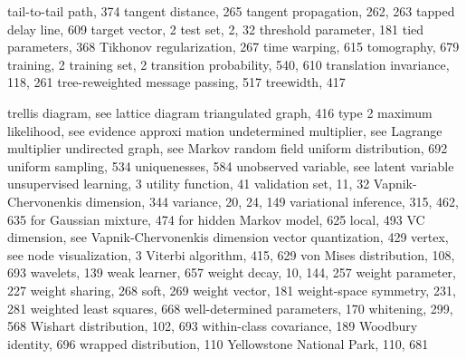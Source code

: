 \documentclass[
  10
]{article}
\begin{document}
tail-to-tail path, 374 tangent distance, 265 tangent propagation, 262,
263 tapped delay line, 609 target vector, 2 test set, 2, 32 threshold
parameter, 181 tied parameters, 368 Tikhonov regularization, 267 time
warping, 615 tomography, 679 training, 2 training set, 2 transition
probability, 540, 610 translation invariance, 118, 261 tree-reweighted
message passing, 517 treewidth, 417

trellis diagram, see lattice diagram triangulated graph, 416 type 2
maximum likelihood, see evidence approxi mation undetermined multiplier,
see Lagrange multiplier undirected graph, see Markov random field
uniform distribution, 692 uniform sampling, 534 uniquenesses, 584
unobserved variable, see latent variable unsupervised learning, 3
utility function, 41 validation set, 11, 32 Vapnik-Chervonenkis
dimension, 344 variance, 20, 24, 149 variational inference, 315, 462,
635 for Gaussian mixture, 474 for hidden Markov model, 625 local, 493 VC
dimension, see Vapnik-Chervonenkis dimension vector quantization, 429
vertex, see node visualization, 3 Viterbi algorithm, 415, 629 von Mises
distribution, 108, 693 wavelets, 139 weak learner, 657 weight decay, 10,
144, 257 weight parameter, 227 weight sharing, 268 soft, 269 weight
vector, 181 weight-space symmetry, 231, 281 weighted least squares, 668
well-determined parameters, 170 whitening, 299, 568 Wishart
distribution, 102, 693 within-class covariance, 189 Woodbury identity,
696 wrapped distribution, 110 Yellowstone National Park, 110, 681
\end{document}
